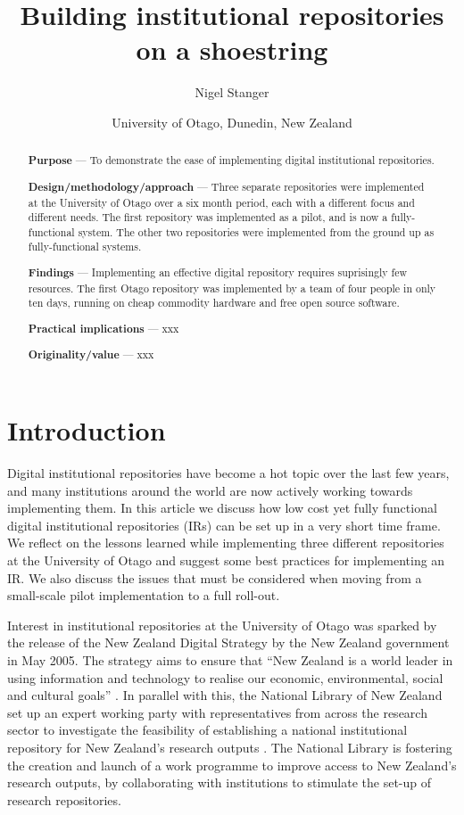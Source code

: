 \documentclass[12pt,pdftex,a4paper,titlepage]{article}
\title{Building institutional repositories on a shoestring}
\author{Nigel Stanger}
\date{University of Otago, Dunedin, New Zealand}
\begin{document}
\maketitle




\begin{abstract}
\textbf{Purpose} --- To demonstrate the ease of implementing digital institutional repositories.

\noindent\textbf{Design/methodology/approach} --- Three separate repositories were implemented at the University of Otago over a six month period, each with a different focus and different needs. The first repository was implemented as a pilot, and is now a fully-functional system. The other two repositories were implemented from the ground up as fully-functional systems.

\noindent\textbf{Findings} --- Implementing an effective digital repository requires suprisingly few resources. The first Otago repository was implemented by a team of four people in only ten days, running on cheap commodity hardware and free open source software.

\noindent\textbf{Practical implications} --- xxx

\noindent\textbf{Originality/value} --- xxx
\end{abstract}


\section{Introduction}

Digital institutional repositories have become a hot topic over the last few years, and many institutions around the world are now actively working towards implementing them. In this article we discuss how low cost yet fully functional digital institutional repositories (IRs) can be set up in a very short time frame. We reflect on the lessons learned while implementing three different repositories at the University of Otago and suggest some best practices for implementing an IR. We also discuss the issues that must be considered when moving from a small-scale pilot implementation to a full roll-out.

Interest in institutional repositories at the University of Otago was sparked by the release of the New Zealand Digital Strategy by the New Zealand government in May 2005. The strategy aims to ensure that ``New Zealand is a world leader in using information and technology to realise our economic, environmental, social and cultural goals'' \cite{NZG-2005-digital_strategy}. In parallel with this, the National Library of New Zealand set up an expert working party with representatives from across the research sector to investigate the feasibility of establishing a national institutional repository for New Zealand's research outputs \cite{Rank-J-2005-feasibility}. The National Library is fostering the creation and launch of a work programme to improve access to New Zealand's research outputs, by collaborating with institutions to stimulate the set-up of research repositories.
\end{document}
